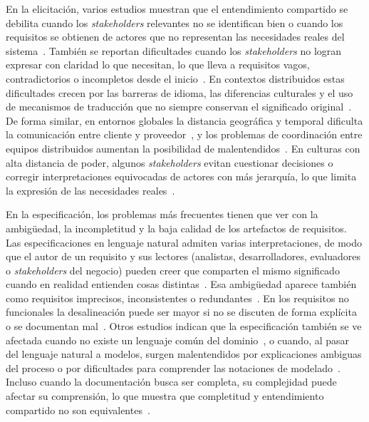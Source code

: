 \documentclass[12pt,letterpaper,oneside]{report}
\begin{document}
En la elicitación, varios estudios muestran que el entendimiento compartido se
debilita cuando los \textit{stakeholders} relevantes no se identifican bien o
cuando los requisitos se obtienen de actores que no representan las
necesidades reales del sistema~\cite{khan2022stakeholders}. También se reportan
dificultades cuando los \textit{stakeholders} no logran expresar con claridad lo
que necesitan, lo que lleva a requisitos vagos, contradictorios o incompletos
desde el inicio~\cite{laporte2023}. En contextos distribuidos estas
dificultades crecen por las barreras de idioma, las diferencias culturales y
el uso de mecanismos de traducción que no siempre conservan el significado
original~\cite{calefato2015}. De forma similar, en entornos globales la
distancia geográfica y temporal dificulta la comunicación entre cliente y
proveedor~\cite{khan2021}, y los problemas de coordinación entre equipos
distribuidos aumentan la posibilidad de malentendidos~\cite{akbar2021}. En
culturas con alta distancia de poder, algunos \textit{stakeholders} evitan
cuestionar decisiones o corregir interpretaciones equivocadas de actores con
más jerarquía, lo que limita la expresión de las necesidades
reales~\cite{alsanoosy2019power}.

En la especificación, los problemas más frecuentes tienen que ver con la
ambigüedad, la incompletitud y la baja calidad de los artefactos de requisitos.
Las especificaciones en lenguaje natural admiten varias interpretaciones, de
modo que el autor de un requisito y sus lectores (analistas, desarrolladores,
evaluadores o \textit{stakeholders} del negocio) pueden creer que comparten el
mismo significado cuando en realidad entienden cosas
distintas~\cite{ribeiro2020}. Esa ambigüedad aparece también como requisitos
imprecisos, inconsistentes o redundantes~\cite{gupta2022}. En los requisitos no
funcionales la desalineación puede ser mayor si no se discuten de forma
explícita o se documentan mal~\cite{behutiye2022quality}. Otros estudios indican que la
especificación también se ve afectada cuando no existe un lenguaje común del
dominio~\cite{antonelli2016}, o cuando, al pasar del lenguaje natural a
modelos, surgen malentendidos por explicaciones ambiguas del proceso o por
dificultades para comprender las notaciones de modelado~\cite{hayashi2024}.
Incluso cuando la documentación busca ser completa, su complejidad puede afectar
su comprensión, lo que muestra que completitud y entendimiento compartido no son
equivalentes~\cite{balasubramaniam2023}.
\end{document}
